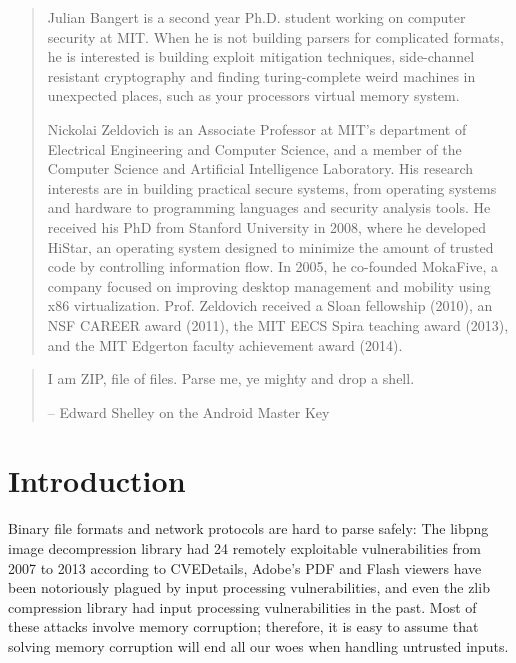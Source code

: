 \begin{quote}
Julian Bangert is a second year Ph.D. student working on computer security at MIT. When he is not
building parsers for complicated formats, he is interested is building exploit mitigation
techniques, side-channel resistant cryptography and finding turing-complete weird machines in
unexpected places, such as your processors virtual memory system.

Nickolai Zeldovich is an Associate Professor at MIT's department of Electrical Engineering and Computer Science, and a member of the Computer Science and Artificial Intelligence Laboratory. His research interests are in building practical secure systems, from operating systems and hardware to programming languages and security analysis tools. He received his PhD from Stanford University in 2008, where he developed HiStar, an operating system designed to minimize the amount of trusted code by controlling information flow. In 2005, he co-founded MokaFive, a company focused on improving desktop management and mobility using x86 virtualization. Prof. Zeldovich received a Sloan fellowship (2010), an NSF CAREER award (2011), the MIT EECS Spira teaching award (2013), and the MIT Edgerton faculty achievement award (2014).
\end{quote}
\begin{quote}
  I am ZIP, file of files.
  Parse me, ye mighty and drop a shell.

  -- Edward Shelley on the Android Master Key
\end{quote}
\section{Introduction}
\label{sec:intro}
Binary file formats and network protocols are hard to parse safely: 
The libpng image decompression library had 24 remotely
exploitable vulnerabilities from 2007 to 2013 according to CVEDetails,
Adobe's PDF and Flash viewers have been notoriously plagued by input
processing vulnerabilities, and even the zlib compression library had
input processing vulnerabilities in the past.
Most of these attacks involve memory corruption; therefore, it is easy to assume that 
solving memory corruption will end all our woes when handling untrusted inputs. 

